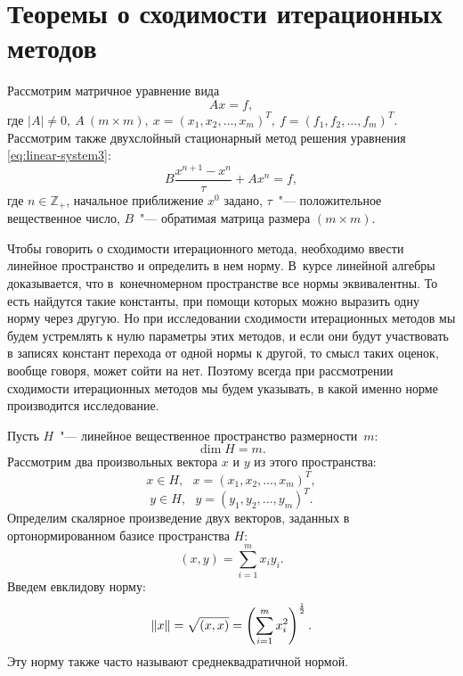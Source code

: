 \documentclass[11pt,a4paper,twoside,listtotoc,bibtotoc]{report}
\numberwithin{equation}{section}
\theoremstyle{definition}
\theoremstyle{plain}
\DeclarePairedDelimiter\norm{\lVert}{\rVert}
\begin{document}
\section{Теоремы о сходимости итерационных методов}
%
Рассмотрим матричное уравнение вида
%
\begin{equation}
    \label{eq:linear-system3}
    Ax = f,
\end{equation}
%
где
$
|A| \ne 0, ~A~(m \times m),~
x = (x_1, x_2, \ldots, x_m)^T,~
f = (f_1, f_2, \ldots, f_m)^T
$.
\\
Рассмотрим также двухслойный стационарный метод решения уравнения
\eqref{eq:linear-system3}:
%
\begin{equation}
    \label{eq:iter-process}
    B\frac{x^{n+1} - x^n}{\tau} + Ax^n = f,
\end{equation}
%
где $n \in \mathbb{Z}_+$, начальное приближение $x^0$ задано,
$\tau$~"--- положительное вещественное число, $B$~"--- обратимая матрица размера
$(m \times m)$.

Чтобы говорить о сходимости итерационного метода, необходимо
ввести линейное пространство и определить в нем норму. В~курсе линейной алгебры
доказывается, что в~конечномерном
пространстве все нормы эквивалентны. То есть найдутся такие константы,
при помощи которых можно выразить одну норму через другую. Но при
исследовании сходимости итерационных методов мы будем устремлять
к нулю параметры этих методов, и если они будут участвовать
в записях констант перехода от одной нормы к другой, то смысл таких
оценок, вообще говоря, может сойти на нет. Поэтому всегда при
рассмотрении сходимости итерационных методов мы будем указывать,
в какой именно норме производится исследование.

Пусть $H$~"--- линейное вещественное пространство размерности~$m$:
%
$$
    \dim H = m.
$$
%
Рассмотрим два произвольных вектора $x$ и $y$ из этого пространства:
%
$$
    x \in H, ~~~x = (x_1, x_2, \ldots, x_m)^T,
$$
%
%
$$
    y \in H, ~~~y = (y_1, y_2, \ldots, y_m)^T.
$$
%
Определим скалярное произведение двух векторов, заданных в ортонормированном
базисе пространства $H$:
$$
    (x,y) = \sum\limits_{i=1}^{m} x_iy_i.
$$
%
Введем евклидову норму:
%
$$
    \norm{x} = \sqrt{(x,x)} =
        \left(\sum\limits_{i=1}^{m} x_i^2\right)^{\frac{1}{2}}.
$$
%
Эту норму также часто называют среднеквадратичной нормой.
\end{document}
